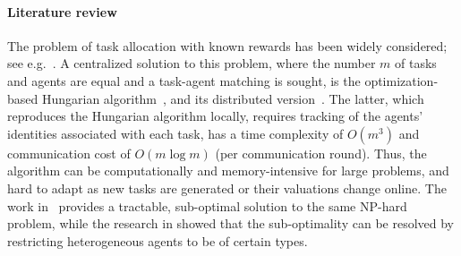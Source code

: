 \documentclass{IEEEtran}
\newcommand{\marginn}[1]{\marginpar{\color{blue}\tiny\ttfamily#1}}
\newcommand{\margin}[1]{\marginpar{\color{magenta}\tiny\ttfamily#1}}
\begin{document}
\paragraph{Literature review}
The problem of task allocation with known rewards has been widely
considered; see e.g.~\cite{HLC-LB-JPH:09, FB-EF-MP-KS-SLS:11,
  AS-SLS:17}. A centralized solution to this problem, where the number
$m$ of tasks and agents are equal and a task-agent matching is sought,
is the optimization-based Hungarian algorithm~\cite{HWK:55}, and its
distributed version~\cite{SC-GN-MR-ME:17}. The latter, which
reproduces the Hungarian algorithm locally, requires tracking of the
agents' identities associated with each task, has a time complexity of
$O(m^3)$ and communication cost of $O(m\log m)$ (per communication
round). Thus, the algorithm can be computationally and
memory-intensive for large problems, and hard to adapt as new tasks are generated or
their valuations change online.
%
% 
%
%
The work in~\cite{JC-AF-PM-SDS:14} provides a tractable, sub-optimal
solution to the same NP-hard problem, 
while the research in
\cite{AP-SS-HLC:18} showed that the sub-optimality can be resolved by
restricting heterogeneous agents to be of certain types. 
\end{document}
